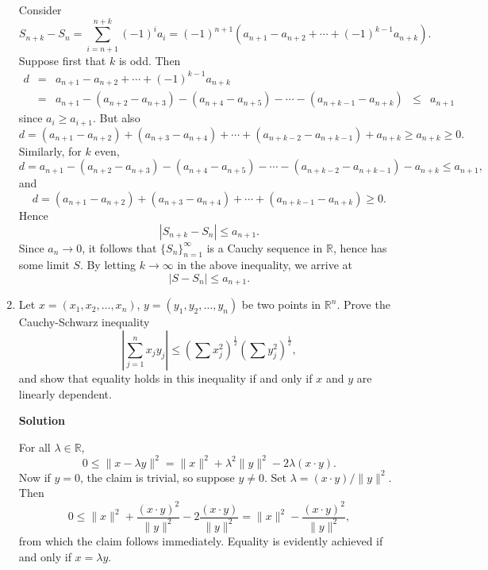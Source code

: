 \documentclass{article}
\begin{document}
\begin{enumerate}
Consider
\[S_{n + k} - S_n = \sum_{i = n + 1}^{n + k} (-1)^i a_i
                  = (-1)^{n + 1} \left( a_{n + 1} - a_{n + 2} + \cdots + (-1)^{k - 1} a_{n + k} \right).\]
Suppose first that \(k\) is odd.  Then
\[\begin{array}{*{5}{c}}
  d & = & a_{n + 1} - a_{n + 2} + \cdots + (-1)^{k - 1} a_{n + k} & & \\
    & = & a_{n + 1} - (a_{n + 2} - a_{n + 3}) - (a_{n + 4} - a_{n + 5}) - \cdots - (a_{n + k - 1} - a_{n + k}) & \leq & a_{n + 1}
  \end{array}\]
since \(a_i \geq a_{i + 1}\).  But also
\[d = (a_{n + 1} - a_{n + 2}) + (a_{n + 3} - a_{n + 4}) + \cdots + (a_{n + k - 2} - a_{n + k - 1}) + a_{n + k} \geq a_{n + k} \geq 0.\]
Similarly, for \(k\) even,
\[d = a_{n + 1} - (a_{n + 2} - a_{n + 3}) - (a_{n + 4} - a_{n + 5}) - \cdots - (a_{n + k - 2} - a_{n + k - 1}) - a_{n + k} \leq a_{n + 1},\]
and
\[d = (a_{n + 1} - a_{n + 2}) + (a_{n + 3} - a_{n + 4}) + \cdots + (a_{n + k - 1} - a_{n + k}) \geq 0.\]
Hence
\[|S_{n + k} - S_n| \leq a_{n + 1}.\]
Since \(a_n \to 0\), it follows that \(\{S_n\}_{n = 1}^{\infty}\) is a Cauchy sequence in \(\mathbb{R}\), hence has some limit \(S\).  By letting \(k \to \infty\) in the above inequality, we arrive at
\[|S - S_n| \leq a_{n + 1}.\]



\item Let \(x = (x_1, x_2, \ldots, x_n)\), \(y = (y_1, y_2, \ldots, y_n)\) be two points in \(\mathbb{R}^n\).  Prove the Cauchy-Schwarz inequality
\[\left| \sum_{j = 1}^n x_j y_j \right| \leq \left( \sum x_j^2 \right)^{\frac{1}{2}} \left( \sum y_j^2 \right)^{\frac{1}{2}},\]
and show that equality holds in this inequality if and only if \(x\) and \(y\) are linearly dependent.

{\bf Solution}

For all \(\lambda \in \mathbb{R}\),
\[0 \leq \|x - \lambda y\|^2 = \|x\|^2 + \lambda^2 \|y\|^2 - 2 \lambda (x \cdot y).\]
Now if \(y = 0\), the claim is trivial, so suppose \(y \neq 0\).  Set \(\lambda = (x \cdot y) / \|y\|^2\).  Then
\[0 \leq \|x\|^2 + \frac{(x \cdot y)^2}{\|y\|^2} - 2 \frac{(x \cdot y)}{\|y\|^2}
       = \|x\|^2 - \frac{(x \cdot y)^2}{\|y\|^2},\]
from which the claim follows immediately.  Equality is evidently achieved if and only if \(x = \lambda y\).



\end{enumerate}
\end{document}

